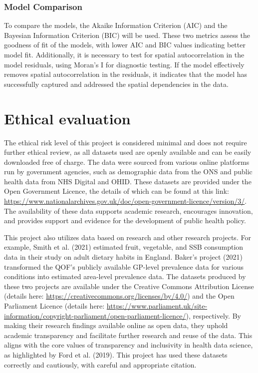 \subsubsection{Model Comparison}
\label{sec:3.4.5.2}
To compare the models, the Akaike Information Criterion (AIC) and the Bayesian Information Criterion (BIC) will be used. These two metrics assess the goodness of fit of the models, with lower AIC and BIC values indicating better model fit. Additionally, it is necessary to test for spatial autocorrelation in the model residuals, using Moran's I for diagnostic testing. If the model effectively removes spatial autocorrelation in the residuals, it indicates that the model has successfully captured and addressed the spatial dependencies in the data.

\section{Ethical evaluation}
\label{sec:3.5}
The ethical risk level of this project is considered minimal and does not require further ethical review, as all datasets used are openly available and can be easily downloaded free of charge. The data were sourced from various online platforms run by government agencies, such as demographic data from the ONS and public health data from NHS Digital and OHID. These datasets are provided under the Open Government Licence, the details of which can be found at this link: \url{https://www.nationalarchives.gov.uk/doc/open-government-licence/version/3/}. The availability of these data supports academic research, encourages innovation, and provides support and evidence for the development of public health policy.

This project also utilizes data based on research and other research projects. For example, Smith et al. (2021) estimated fruit, vegetable, and SSB consumption data in their study on adult dietary habits in England. Baker's project (2021) transformed the QOF's publicly available GP-level prevalence data for various conditions into estimated area-level prevalence data. The datasets produced by these two projects are available under the Creative Commons Attribution License (details here: \url{https://creativecommons.org/licenses/by/4.0/}) and the Open Parliament Licence (details here: \url{https://www.parliament.uk/site-information/copyright-parliament/open-parliament-licence/}), respectively. By making their research findings available online as open data, they uphold academic transparency and facilitate further research and reuse of the data. This aligns with the core values of transparency and inclusivity in health data science, as highlighted by Ford et al. (2019). This project has used these datasets correctly and cautiously, with careful and appropriate citation.

